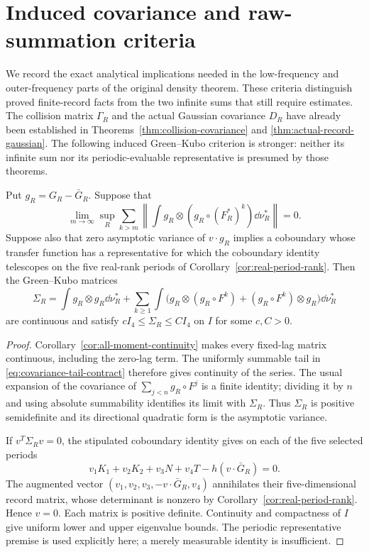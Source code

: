 \section{Induced covariance and raw-summation criteria}
\label{sec:closure-contracts}
We record the exact analytical implications needed in the low-frequency
and outer-frequency parts of the original density theorem. These
criteria distinguish proved finite-record facts from the two infinite
sums that still require estimates. The collision matrix $\Gamma_R$ and
the actual Gaussian covariance $D_R$ have already been established in
Theorems~\ref{thm:collision-covariance} and
\ref{thm:actual-record-gaussian}. The following induced Green--Kubo
criterion is stronger: neither its infinite sum nor its periodic-evaluable
representative is presumed by those theorems.

\begin{proposition}
\label{prop:covariance-closure}
Put $g_R=G_R-\bar G_R$. Suppose that
\begin{equation}\label{eq:covariance-tail-contract}
 \lim_{m\to\infty}\sup_R\sum_{k>m}
       \left\|\int g_R\otimes(g_R\circ(F_R^*)^k)\dd\nu_R^*\right\|=0.
\end{equation}
Suppose also that zero asymptotic variance of $v\cdot g_R$ implies a
coboundary whose transfer function has a representative for which the
coboundary identity telescopes on the five real-rank periods of
Corollary~\ref{cor:real-period-rank}. Then the Green--Kubo matrices
\[
 \Sigma_R=\int g_R\otimes g_R\dd\nu_R^*
  +\sum_{k\ge1}\int\bigl(g_R\otimes(g_R\circ F^k)
                    +(g_R\circ F^k)\otimes g_R\bigr)\dd\nu_R^*
\]
are continuous and satisfy $cI_4\le\Sigma_R\le CI_4$ on $I$ for some
$c,C>0$.
\end{proposition}
\begin{proof}
Corollary~\ref{cor:all-moment-continuity} makes every fixed-lag matrix
continuous, including the zero-lag term. The uniformly summable tail in
\eqref{eq:covariance-tail-contract} therefore gives continuity of the
series. The usual expansion of the covariance of $\sum_{j<n}g_R\circ F^j$
is a finite identity; dividing it by $n$ and using absolute summability
identifies its limit with $\Sigma_R$. Thus $\Sigma_R$ is positive
semidefinite and its directional quadratic form is the asymptotic
variance.

If $v^T\Sigma_Rv=0$, the stipulated coboundary identity gives on each of
the five selected periods
\[
 v_1K_1+v_2K_2+v_3N+v_4T-h(v\cdot\bar G_R)=0.
\]
The augmented vector $(v_1,v_2,v_3,-v\cdot\bar G_R,v_4)$ annihilates
their five-dimensional record matrix, whose determinant is nonzero by
Corollary~\ref{cor:real-period-rank}. Hence $v=0$. Each matrix is
positive definite. Continuity and compactness of $I$ give uniform lower
and upper eigenvalue bounds. The periodic representative premise is
used explicitly here; a merely measurable identity is insufficient.
\end{proof}


